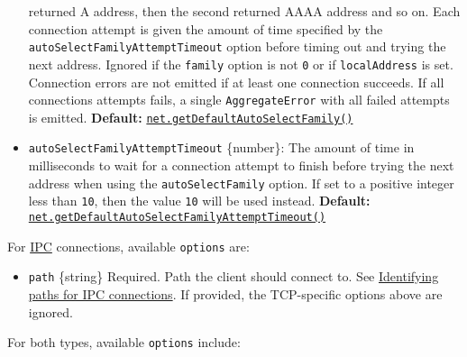 \begin{itemize}
  returned A address, then the second returned AAAA address and so on.
  Each connection attempt is given the amount of time specified by the
  \texttt{autoSelectFamilyAttemptTimeout} option before timing out and
  trying the next address. Ignored if the \texttt{family} option is not
  \texttt{0} or if \texttt{localAddress} is set. Connection errors are
  not emitted if at least one connection succeeds. If all connections
  attempts fails, a single \texttt{AggregateError} with all failed
  attempts is emitted. \textbf{Default:}
  \hyperref[netgetdefaultautoselectfamily]{\texttt{net.getDefaultAutoSelectFamily()}}
\item
  \texttt{autoSelectFamilyAttemptTimeout} \{number\}: The amount of time
  in milliseconds to wait for a connection attempt to finish before
  trying the next address when using the \texttt{autoSelectFamily}
  option. If set to a positive integer less than \texttt{10}, then the
  value \texttt{10} will be used instead. \textbf{Default:}
  \hyperref[netgetdefaultautoselectfamilyattempttimeout]{\texttt{net.getDefaultAutoSelectFamilyAttemptTimeout()}}
\end{itemize}

For \hyperref[ipc-support]{IPC} connections, available \texttt{options}
are:

\begin{itemize}
\tightlist
\item
  \texttt{path} \{string\} Required. Path the client should connect to.
  See \hyperref[identifying-paths-for-ipc-connections]{Identifying paths
  for IPC connections}. If provided, the TCP-specific options above are
  ignored.
\end{itemize}

For both types, available \texttt{options} include:

